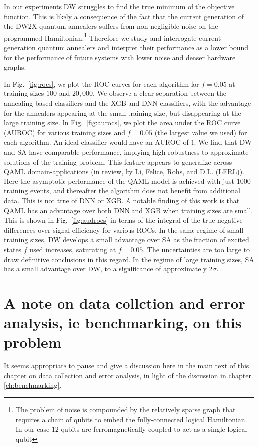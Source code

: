 In our experiments DW struggles to find the true minimum of the objective function. This is likely a consequence of the fact that the current generation of the DW2X quantum annealers suffers from non-negligible noise on the programmed Hamiltonian.\footnote{The problem of noise is compounded by the relatively sparse graph that requires a chain of qubits to embed the fully-connected logical Hamiltonian. In our case  $12$ qubits are ferromagnetically coupled  to act as a single logical qubit} Therefore we study and  interrogate current-generation quantum annealers and interpret their performance as a lower bound for the performance of future systems with lower noise and denser hardware graphs.

In Fig.~\ref{fig:rocs}, we plot the ROC curves for each algorithm for $f=0.05$ at training sizes $100$ and $20,000$.  We observe a clear separation between the annealing-based classifiers and the XGB and DNN classifiers, with the advantage for the annealers appearing at the small training size, but disappearing at the large training size. In Fig.~\ref{fig:aurocs}, we plot the area under the ROC curve (AUROC) for various training sizes and $f=0.05$ (the largest value we used)  for each algorithm. An ideal classifier would have an AUROC of $1$. We find that DW and SA have comparable performance, implying high robustness to approximate solutions of the training problem. This feature appears to generalize across QAML domain-applications (in review, by Li, Felice, Rohs, and D.L. (LFRL)).
Here the  asymptotic performance of the QAML model is achieved with just $1000$ training events, and thereafter the algorithm does not benefit from additional data.  This is not true of DNN or XGB. A notable finding of this work is that QAML has an advantage over both DNN and XGB when training sizes are small. This is shown in Fig.~\ref{fig:audrocs} in terms of the integral of the true negative differences over signal efficiency for various ROCs. In the same regime of small training sizes, DW develops a small advantage over SA as the fraction of excited states $f$ used increases, saturating at $f=0.05$. The uncertainties are too large to draw definitive conclusions in this regard. In the regime of large training sizes, SA has a small advantage over DW, to a significance of approximately $2\sigma$.

\section{A note on data collction and error analysis, ie benchmarking, on this problem}
It seems appropriate to pause and give a discussion here in the main text of this chapter on data collection and error analysis, in light of the discussion in chapter \ref{ch:benchmarking}.


